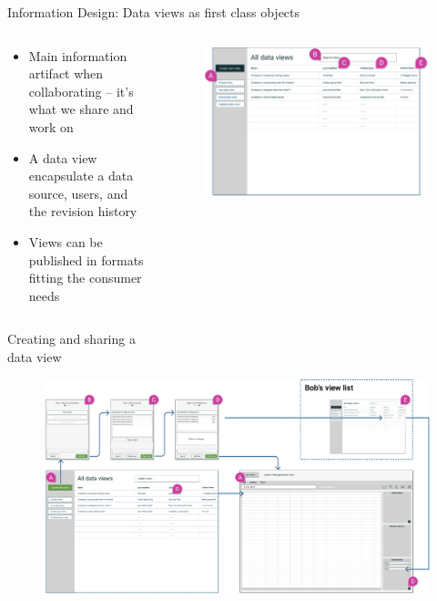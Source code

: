 \documentclass[aspectratio=169]{beamer}
\begin{document}
\begin{frame}{Information Design: Data views as first class objects}
    \begin{columns}
        \begin{column}{0.4\textwidth}
            \begin{itemize}
                \footnotesize
                \item Main information artifact when collaborating -- it's what we share and work on
                \item A data view encapsulate a data source, users, and the revision history
                \item Views can be published in formats fitting the consumer needs
            \end{itemize}
        \end{column}
        \begin{column}{0.6\textwidth}
            \begin{figure}[h]
                \centering
                \includegraphics[width=1.1\textwidth]{images/all-views-with-marks.png}
            \end{figure}
        \end{column}
    \end{columns}
\end{frame}

\begin{frame}{Creating and sharing a\\ data view}
    \begin{figure}[h]
        \centering
        \includegraphics[width=1\textwidth]{images/create-new-view-flow.png}
    \end{figure}
\end{frame}
\end{document}
